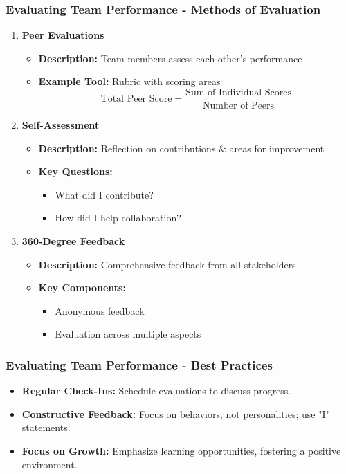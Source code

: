 \documentclass[aspectratio=169]{beamer}
\begin{document}
\begin{frame}[fragile]
    \frametitle{Evaluating Team Performance - Methods of Evaluation}
    \begin{enumerate}
        \item \textbf{Peer Evaluations}
            \begin{itemize}
                \item \textbf{Description:} Team members assess each other's performance
                \item \textbf{Example Tool:} Rubric with scoring areas
                \[
                    \text{Total Peer Score} = \frac{\text{Sum of Individual Scores}}{\text{Number of Peers}}
                \]
            \end{itemize}
        \item \textbf{Self-Assessment}
            \begin{itemize}
                \item \textbf{Description:} Reflection on contributions & areas for improvement
                \item \textbf{Key Questions:}
                    \begin{itemize}
                        \item What did I contribute?
                        \item How did I help collaboration?
                    \end{itemize}
            \end{itemize}
        \item \textbf{360-Degree Feedback}
            \begin{itemize}
                \item \textbf{Description:} Comprehensive feedback from all stakeholders
                \item \textbf{Key Components:}
                    \begin{itemize}
                        \item Anonymous feedback
                        \item Evaluation across multiple aspects
                    \end{itemize}
            \end{itemize}
    \end{enumerate}
\end{frame}

\begin{frame}[fragile]
    \frametitle{Evaluating Team Performance - Best Practices}
    \begin{itemize}
        \item \textbf{Regular Check-Ins:} Schedule evaluations to discuss progress.
        \item \textbf{Constructive Feedback:} Focus on behaviors, not personalities; use "I" statements.
        \item \textbf{Focus on Growth:} Emphasize learning opportunities, fostering a positive environment.
    \end{itemize}
\end{frame}
\end{document}
